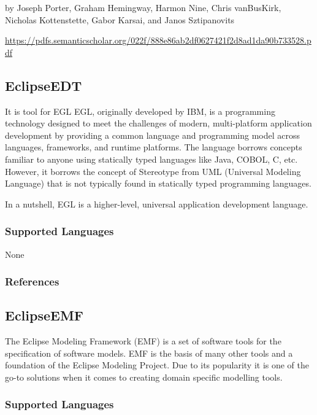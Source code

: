 by Joseph Porter, Graham Hemingway, Harmon Nine, Chris vanBusKirk,
Nicholas Kottenstette, Gabor Karsai, and Janos Sztipanovits

\url{https://pdfs.semanticscholar.org/022f/888e86ab2df0627421f2d8ad1da90b733528.pdf}



\subsection{EclipseEDT}
\label{subsecT:EclipseEDT}


It is tool for EGL
EGL, originally developed by IBM, is a programming technology designed to meet the challenges of modern, multi-platform application development by providing a common language and programming model across languages, frameworks, and runtime platforms. The language borrows concepts familiar to anyone using statically typed languages like Java, COBOL, C, etc. However, it borrows the concept of Stereotype from UML (Universal Modeling Language) that is not typically found in statically typed programming languages.

In a nutshell, EGL is a higher-level, universal application development language.

\subsubsection{Supported Languages}

None


\subsubsection{References}





\subsection{EclipseEMF}
\label{subsecT:EclipseEMF}

The Eclipse Modeling Framework (EMF) is a set of software tools for the specification of software models.
EMF is the basis of many other tools and a foundation of the Eclipse Modeling Project.
Due to its popularity it is one of the go-to solutions when it comes to creating domain specific modelling tools.

\subsubsection{Supported Languages}

